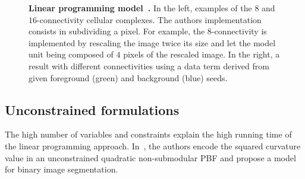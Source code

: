 \begin{figure}
\begin{minipage}{0.25\textwidth}
\end{minipage}%
\begin{minipage}{0.75\textwidth}
\center
{}
\end{minipage}%
\caption{\textbf{Linear programming model~\cite{schoenemann09linear}.} In the left, examples of the $8$ and $16$-connectivity cellular complexes. The authors implementation consists in subdividing a pixel. For example, the $8$-connectivity is implemented by rescaling the image twice its size and let the model unit being composed of $4$ pixels of the rescaled image. In the right, a result with different connectivities using a data term derived from given foreground (green) and background (blue) seeds. }
\end{figure}

\subsection{Unconstrained formulations}

The high number of variables and constraints explain the high running time of the linear programming approach. In~\cite{zehiry10fast}, the authors encode the squared curvature value in an unconstrained quadratic non-submodular PBF and propose a model for binary image segmentation.

